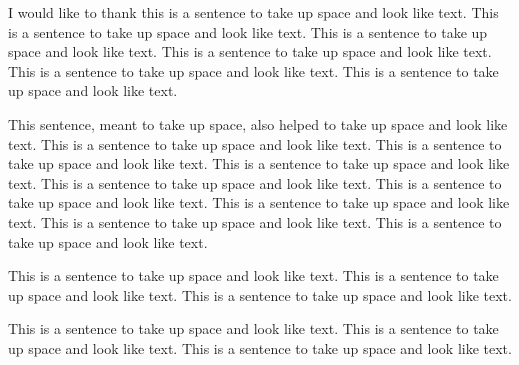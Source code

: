  
 
I would like to thank this is a sentence to take up space and look
like text.  This is a sentence to take up space and look like text.
This is a sentence to take up space and look like text.  This is a
sentence to take up space and look like text.  This is a sentence to
take up space and look like text.  This is a sentence to take up space
and look like text.
 
This sentence, meant to take up space, also helped to take up space
and look like text.  This is a sentence to take up space and look like
text.  This is a sentence to take up space and look like text.  This
is a sentence to take up space and look like text.  This is a sentence
to take up space and look like text.  This is a sentence to take up
space and look like text.  This is a sentence to take up space and
look like text.  This is a sentence to take up space and look like
text.  This is a sentence to take up space and look like text.
 
This is a sentence to take up space and look like text.
This is a sentence to take up space and look like text.
This is a sentence to take up space and look like text.
 
This is a sentence to take up space and look like text.
This is a sentence to take up space and look like text.
This is a sentence to take up space and look like text.
